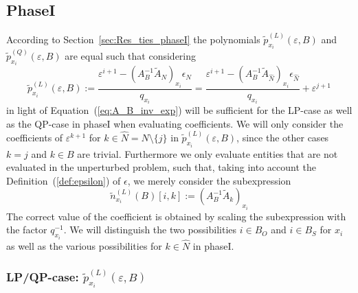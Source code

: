 \documentclass[a4paper]{article}
\begin{document}
\subsection{PhaseI}
According to Section~\ref{sec:Res_ties_phaseI} the polynomials
$\tilde{p}_{x_{i}}^{(L)}(\varepsilon, B)$ and
$\tilde{p}_{x_{i}}^{(Q)}(\varepsilon, B)$ are equal such that considering
\begin{equation}
\label{eq:p_x_i_tilde_ref}
\tilde{p}_{x_{i}}^{(L)}\left(\varepsilon, B\right) := 
  \frac{\varepsilon^{i+1}
  - \left(A_{B}^{-1}\tilde{A}_{N}\right)_{x_{i}}
  \epsilon_{N}}{q_{x_{i}}}
= 
\frac{\varepsilon^{i+1}
- \left(A_{B}^{-1}\tilde{A}_{\hat{N}}\right)_{x_{i}}
  \epsilon_{\hat{N}}}{q_{x_{i}}}
+ \varepsilon^{j+1}
\end{equation}
in light of Equation~(\ref{eq:A_B_inv_exp})
will be sufficient for the LP-case as well as the QP-case
in phaseI when evaluating coefficients.
We will only consider the coefficients of
$\varepsilon^{k+1}$ for $k \in \hat{N}= N \setminus \{j\}$ in
$\tilde{p}_{x_{i}}^{(L)}(\varepsilon, B)$,
since the other cases $k=j$ and $k \in B$
are trivial. Furthermore we only evaluate entities that are not evaluated in the
unperturbed problem, such that, taking into account the
Definition~(\ref{def:epsilon}) of $\epsilon$, we merely consider
the subexpression
\begin{equation}
\label{def:tilde_n_p_x_i_L}
\tilde{n}_{x_{i}}^{(L)}(B)[i,k]:=
(A_{B}^{-1}\tilde{A}_{k})_{x_{i}} 
\end{equation}
The correct value
of the coefficient is obtained by scaling the subexpression with the factor
$q_{x_{i}}^{-1}$.  
We will distinguish the two
possibilities $i \in B_{O}$ and $i \in B_{S}$ for $x_{i}$ as well as the
various possibilities for $k \in \hat{N}$ in phaseI.
 
\subsubsection{LP/QP-case: $\tilde{p}_{x_{i}}^{(L)}(\varepsilon, B)$}
\end{document}
